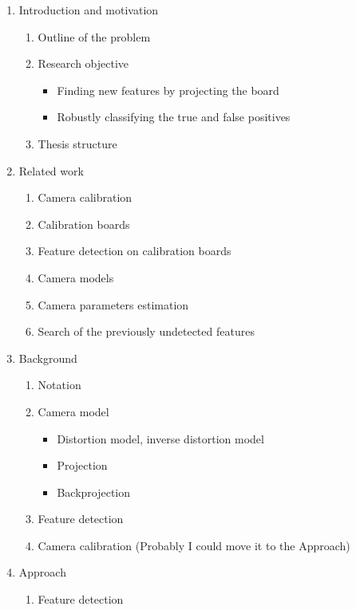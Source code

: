 \begin{enumerate}
	\item Introduction and motivation
	      \begin{enumerate}[label=(\alph*)]
		      \item Outline of the problem
		      \item Research objective
		            \begin{itemize}
			            \item Finding new features by projecting the board
			            \item Robustly classifying the true and false positives
		            \end{itemize}
		      \item Thesis structure
	      \end{enumerate}
	\item Related work
	      \begin{enumerate}[label=(\alph*)]
		      \item Camera calibration
		      \item Calibration boards
		      \item Feature detection on calibration boards
		      \item Camera models
		      \item Camera parameters estimation
		      \item Search of the previously undetected features
	      \end{enumerate}
	\item Background
	      \begin{enumerate}[label=(\alph*)]
		      \item Notation
		      \item Camera model
		            \begin{itemize}
			            \item Distortion model, inverse distortion model
			            \item Projection
			            \item Backprojection
		            \end{itemize}
		      \item Feature detection
		      \item Camera calibration (Probably I could move it to the Approach)
	      \end{enumerate}
	\item Approach
	      \begin{enumerate}[label=(\alph*)]
		      \item Feature detection

\end{enumerate}
\end{enumerate}
